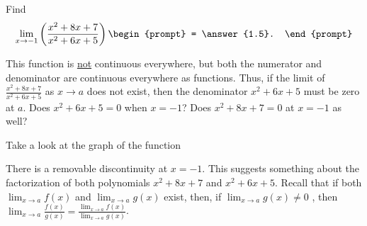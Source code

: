 \documentclass{ximera}
\author{Gregory Hartman \and Matthew Carr}
\begin{document}
\begin{exercise}



  Find 
  \[
  \lim_{x\to-1}\left({\frac{x^2+8x+7}{x^2+6x+5}}\right)
  \begin{prompt}
  = \answer{1.5}.
  \end{prompt}
  \]
    \begin{hint}
      This function is \underline{not} continuous everywhere, but both the numerator and denominator are continuous everywhere as functions. Thus, if the limit of $\frac{x^2+8x+7}{x^2+6x+5}$ as $x\to{a}$ does not exist, then the denominator $x^2+6x+5$ must be zero at $a$. Does $x^2+6x+5=0$ when $x=-1$? Does $x^2+8x+7=0$ at $x=-1$ as well?
    \end{hint}
     \begin{hint}
    Take a look at the graph of the function
    \begin{center}
      \end{center}
      There is a removable discontinuity at $x=-1$. This suggests something about the factorization of both polynomials $x^2+8x+7$ and $x^2+6x+5$. Recall that if both $\lim_{x\to a}f(x)$ and $\lim_{x\to a}g(x)$ exist, then, if  $\lim_{x\to a}g(x)\ne0$ , then $\lim_{x\to a}\frac{f(x)}{g(x)}=\frac{\lim_{x\to a}f(x)}{\lim_{x\to a}g(x)}$.
    \end{hint}
    \begin{hint}

\end{hint}
\end{exercise}
\end{document}
